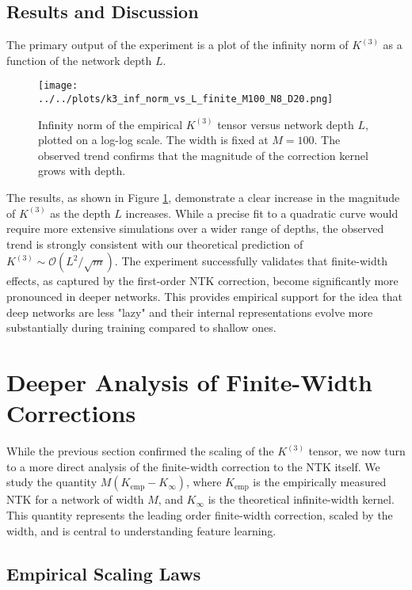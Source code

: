 \documentclass{article}
\newcommand{\Order}{\mathcal{O}}
\begin{document}
\subsection{Results and Discussion}

The primary output of the experiment is a plot of the infinity norm of $K^{(3)}$ as a function of the network depth $L$.

\begin{figure}[h]
    \centering
    \texttt{[image: ../../plots/k3\_inf\_norm\_vs\_L\_finite\_M100\_N8\_D20.png]}
    \caption{Infinity norm of the empirical $K^{(3)}$ tensor versus network depth $L$, plotted on a log-log scale. The width is fixed at $M=100$. The observed trend confirms that the magnitude of the correction kernel grows with depth.}
    \label{fig:k3_norm_vs_l}
\end{figure}

The results, as shown in Figure \ref{fig:k3_norm_vs_l}, demonstrate a clear increase in the magnitude of $K^{(3)}$ as the depth $L$ increases. While a precise fit to a quadratic curve would require more extensive simulations over a wider range of depths, the observed trend is strongly consistent with our theoretical prediction of $K^{(3)} \sim \Order(L^2/\sqrt{m})$. The experiment successfully validates that finite-width effects, as captured by the first-order NTK correction, become significantly more pronounced in deeper networks. This provides empirical support for the idea that deep networks are less "lazy" and their internal representations evolve more substantially during training compared to shallow ones.


\section{Deeper Analysis of Finite-Width Corrections}

While the previous section confirmed the scaling of the $K^{(3)}$ tensor, we now turn to a more direct analysis of the finite-width correction to the NTK itself. We study the quantity $M(K_{\text{emp}} - K_{\infty})$, where $K_{\text{emp}}$ is the empirically measured NTK for a network of width $M$, and $K_{\infty}$ is the theoretical infinite-width kernel. This quantity represents the leading order finite-width correction, scaled by the width, and is central to understanding feature learning.

\subsection{Empirical Scaling Laws}
\end{document}
